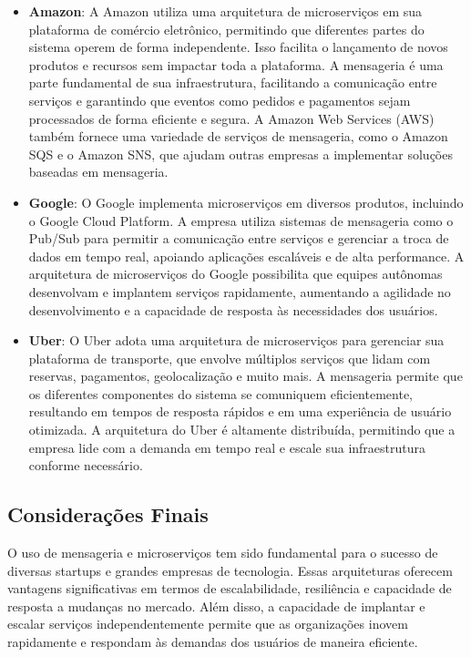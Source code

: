 \begin{itemize}
    \item \textbf{Amazon}: A Amazon utiliza uma arquitetura de microserviços em sua plataforma de comércio eletrônico, permitindo que diferentes partes do sistema operem de forma independente. Isso facilita o lançamento de novos produtos e recursos sem impactar toda a plataforma. A mensageria é uma parte fundamental de sua infraestrutura, facilitando a comunicação entre serviços e garantindo que eventos como pedidos e pagamentos sejam processados de forma eficiente e segura. A Amazon Web Services (AWS) também fornece uma variedade de serviços de mensageria, como o Amazon SQS e o Amazon SNS, que ajudam outras empresas a implementar soluções baseadas em mensageria.

    \item \textbf{Google}: O Google implementa microserviços em diversos produtos, incluindo o Google Cloud Platform. A empresa utiliza sistemas de mensageria como o Pub/Sub para permitir a comunicação entre serviços e gerenciar a troca de dados em tempo real, apoiando aplicações escaláveis e de alta performance. A arquitetura de microserviços do Google possibilita que equipes autônomas desenvolvam e implantem serviços rapidamente, aumentando a agilidade no desenvolvimento e a capacidade de resposta às necessidades dos usuários.

    \item \textbf{Uber}: O Uber adota uma arquitetura de microserviços para gerenciar sua plataforma de transporte, que envolve múltiplos serviços que lidam com reservas, pagamentos, geolocalização e muito mais. A mensageria permite que os diferentes componentes do sistema se comuniquem eficientemente, resultando em tempos de resposta rápidos e em uma experiência de usuário otimizada. A arquitetura do Uber é altamente distribuída, permitindo que a empresa lide com a demanda em tempo real e escale sua infraestrutura conforme necessário.
\end{itemize}

\subsection{Considerações Finais}
O uso de mensageria e microserviços tem sido fundamental para o sucesso de diversas startups e grandes empresas de tecnologia. Essas arquiteturas oferecem vantagens significativas em termos de escalabilidade, resiliência e capacidade de resposta a mudanças no mercado. Além disso, a capacidade de implantar e escalar serviços independentemente permite que as organizações inovem rapidamente e respondam às demandas dos usuários de maneira eficiente.

